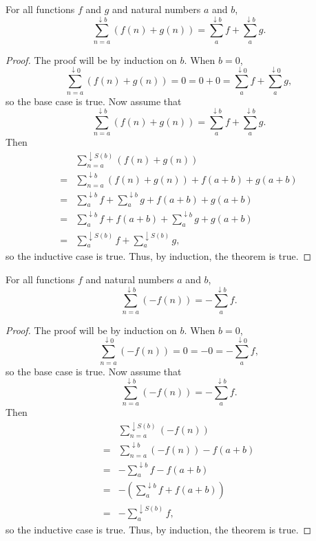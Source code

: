 \documentclass[../../math.tex]{subfiles}
\begin{document}
\begin{theorem}
    For all functions $f$ and $g$ and natural numbers $a$ and $b$,
    \[
        \sum_{n = a}^{\downarrow b} (f(n) + g(n)) =
        \sum_a^{\downarrow b} f + \sum_a^{\downarrow b} g.
    \]
\end{theorem}
\begin{proof}
    The proof will be by induction on $b$.  When $b = 0$,
    \[
        \sum_{n = a}^{\downarrow 0} (f(n) + g(n)) =
        0 = 0 + 0 =
        \sum_a^{\downarrow 0} f + \sum_a^{\downarrow 0} g,
    \]
    so the base case is true.  Now assume that
    \[
        \sum_{n = a}^{\downarrow b} (f(n) + g(n)) =
        \sum_a^{\downarrow b} f + \sum_a^{\downarrow b} g.
    \]
    Then
    \begin{align*}
           & \sum_{n = a}^{\downarrow S(b)} (f(n) + g(n)) \\
        ={}& \sum_{n = a}^{\downarrow b} (f(n) + g(n)) + f(a + b) + g(a + b) \\
        ={}& \sum_a^{\downarrow b} f + \sum_a^{\downarrow b} g
            + f(a + b) + g(a + b) \\
        ={}& \sum_a^{\downarrow b} f + f(a + b) +
             \sum_a^{\downarrow b} g + g(a + b) \\
        ={}& \sum_a^{\downarrow S(b)} f + \sum_a^{\downarrow S(b)} g,
    \end{align*}
    so the inductive case is true.  Thus, by induction, the theorem is true.
\end{proof}

\begin{theorem}
    For all functions $f$ and natural numbers $a$ and $b$,
    \[
        \sum_{n = a}^{\downarrow b} (-f(n)) = -\sum_a^{\downarrow b} f.
    \]
\end{theorem}
\begin{proof}
    The proof will be by induction on $b$.  When $b = 0$,
    \[
        \sum_{n = a}^{\downarrow 0} (-f(n)) =
        0 = -0 =
        -\sum_a^{\downarrow 0} f,
    \]
    so the base case is true.  Now assume that
    \[
        \sum_{n = a}^{\downarrow b} (-f(n)) = -\sum_a^{\downarrow b} f.
    \]
    Then
    \begin{align*}
           & \sum_{n = a}^{\downarrow S(b)} (-f(n)) \\
        ={}& \sum_{n = a}^{\downarrow b} (-f(n)) - f(a + b) \\
        ={}& -\sum_a^{\downarrow b} f - f(a + b) \\
        ={}& -\left( \sum_a^{\downarrow b} f + f(a + b) \right) \\
        ={}& -\sum_a^{\downarrow S(b)} f,
    \end{align*}
    so the inductive case is true.  Thus, by induction, the theorem is true.
\end{proof}
\end{document}
